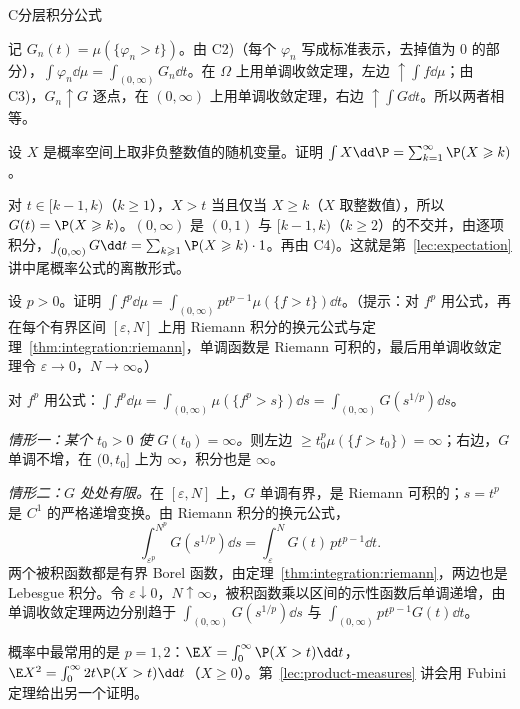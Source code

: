 \begin{probleme}{C}{分层积分公式}
\begin{questions}
\begin{solution}
记 $G_n(t)=\mu(\{\varphi_n>t\})$。由 C2)（每个 $\varphi_n$ 写成标准表示，去掉值为 $0$ 的部分），$\int\varphi_n\dd\mu=\int_{(0,\infty)}G_n\dd t$。在 $\Omega$ 上用单调收敛定理，左边 $\uparrow\int f\dd\mu$；由 C3)，$G_n\uparrow G$ 逐点，在 $(0,\infty)$ 上用单调收敛定理，右边 $\uparrow\int G\dd t$。所以两者相等。
\end{solution}
\item 设 $X$ 是概率空间上取非负整数值的随机变量。证明 $\int X\dd\P=\sum_{k=1}^\infty \P(X\geqslant k)$。
\begin{solution}
对 $t\in[k-1,k)$（$k\geqslant1$），$X>t$ 当且仅当 $X\geqslant k$（$X$ 取整数值），所以 $G(t)=\P(X\geqslant k)$。$(0,\infty)$ 是 $(0,1)$ 与 $[k-1,k)$（$k\geqslant2$）的不交并，由逐项积分，$\int_{(0,\infty)}G\dd t=\sum_{k\geqslant1}\P(X\geqslant k)\cdot1$。再由 C4)。这就是第~\ref{lec:expectation} 讲中尾概率公式的离散形式。
\end{solution}
\item 设 $p>0$。证明 $\int f^p\dd\mu=\int_{(0,\infty)}pt^{p-1}\mu(\{f>t\})\dd t$。（提示：对 $f^p$ 用公式，再在每个有界区间 $[\varepsilon,N]$ 上用 Riemann 积分的换元公式与定理~\ref{thm:integration:riemann}，单调函数是 Riemann 可积的，最后用单调收敛定理令 $\varepsilon\to0$，$N\to\infty$。）
\begin{solution}
对 $f^p$ 用公式：$\int f^p\dd\mu=\int_{(0,\infty)}\mu(\{f^p>s\})\dd s=\int_{(0,\infty)}G(s^{1/p})\dd s$。

\emph{情形一：某个 $t_0>0$ 使 $G(t_0)=\infty$。}则左边 $\geqslant t_0^p\mu(\{f>t_0\})=\infty$；右边，$G$ 单调不增，在 $(0,t_0]$ 上为 $\infty$，积分也是 $\infty$。

\emph{情形二：$G$ 处处有限。}在 $[\varepsilon,N]$ 上，$G$ 单调有界，是 Riemann 可积的；$s=t^p$ 是 $C^1$ 的严格递增变换。由 Riemann 积分的换元公式，
\[
\int_{\varepsilon^p}^{N^p}G(s^{1/p})\dd s=\int_\varepsilon^NG(t)\,pt^{p-1}\dd t .
\]
两个被积函数都是有界 Borel 函数，由定理~\ref{thm:integration:riemann}，两边也是 Lebesgue 积分。令 $\varepsilon\downarrow0$，$N\uparrow\infty$，被积函数乘以区间的示性函数后单调递增，由单调收敛定理两边分别趋于 $\int_{(0,\infty)}G(s^{1/p})\dd s$ 与 $\int_{(0,\infty)}pt^{p-1}G(t)\dd t$。

概率中最常用的是 $p=1,2$：$\E X=\int_0^\infty \P(X>t)\dd t$，$\E X^2=\int_0^\infty2t\P(X>t)\dd t$（$X\geqslant0$）。第~\ref{lec:product-measures} 讲会用 Fubini 定理给出另一个证明。
\end{solution}
\end{questions}
\end{probleme}

